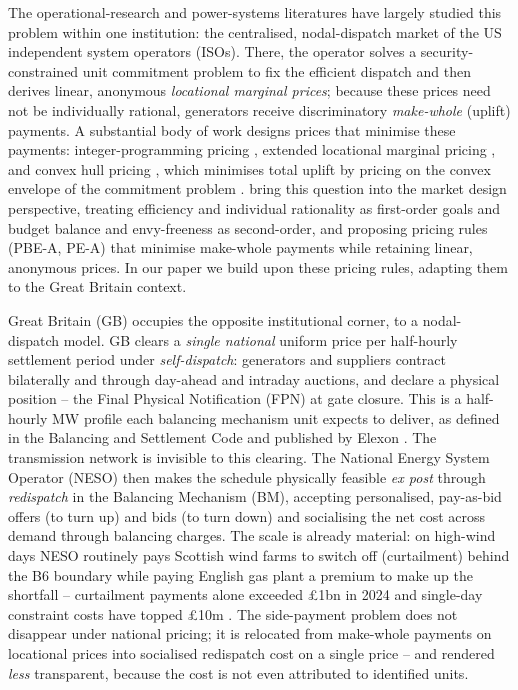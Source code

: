 \documentclass[review,3p,times]{elsarticle}
\theoremstyle{plain}
\theoremstyle{definition}
\begin{document}
The operational-research and power-systems literatures have largely studied this
problem within one institution: the centralised, nodal-dispatch market of the US
independent system operators (ISOs). There, the operator solves a
security-constrained unit commitment problem to fix the efficient dispatch and then
derives linear, anonymous \emph{locational marginal prices}; because these
prices need not be individually rational, generators receive discriminatory
\emph{make-whole} (uplift) payments. A substantial body of work designs prices
that minimise these payments: integer-programming pricing \citep{oneill2005},
extended locational marginal pricing \citep{schiro2016}, and convex hull pricing \citep{gribik2007}, which minimises
total uplift by pricing on the convex envelope of the commitment problem
\citep{hoganring2003,  hua2017, andrianesis2021}.
\citet{bichler2022} bring this question into the market design perspective, treating
efficiency and individual rationality as first-order goals and budget balance
and envy-freeness as second-order, and proposing pricing rules (PBE-A, PE-A)
that minimise make-whole payments while retaining linear, anonymous prices. In our paper we build upon these pricing rules, adapting them to the Great Britain context.

Great Britain (GB) occupies the opposite institutional corner, to a nodal-dispatch model. GB clears a \emph{single national} uniform price per
half-hourly settlement period under \emph{self-dispatch}: generators and
suppliers contract bilaterally and through day-ahead and intraday auctions, and
declare a physical position -- the Final Physical Notification (FPN) at gate closure. This is a
half-hourly MW profile each balancing mechanism unit expects to deliver, as
defined in the Balancing and Settlement Code and published by
Elexon \citep{elexonbsc, elexonbmrs}. The transmission network is invisible to this clearing. The National
Energy System Operator (NESO) then makes the schedule physically feasible
\emph{ex post} through \emph{redispatch} in the Balancing Mechanism (BM),
accepting personalised, pay-as-bid offers (to turn up) and bids (to turn down)
and socialising the net cost across demand through balancing charges. The scale
is already material: on high-wind days NESO routinely pays Scottish wind farms to
switch off  (curtailment) behind the B6 boundary while paying English gas plant a premium to
make up the shortfall -- curtailment payments alone exceeded \pounds1bn in 2024 and
single-day constraint costs have topped \pounds10m \citep{neso2025, modo2025}.
The side-payment problem does not disappear under national pricing; it is relocated from
make-whole payments on locational prices into socialised redispatch cost on a
single price -- and rendered \emph{less} transparent, because the cost is not even
attributed to identified units.
\end{document}
